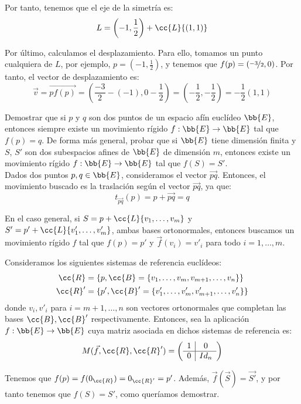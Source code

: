 \begin{ejercicio}
    Por tanto, tenemos que el eje de la simetría es:
    \begin{equation*}
        L = \left(-1, \frac{1}{2}\right) + \cc{L}\{(1,1)\}
    \end{equation*}

    Por último, calculamos el desplazamiento. Para ello, tomamos un punto cualquiera de $L$, por ejemplo, $p=\left(-1, \frac{1}{2}\right)$, y tenemos que $f(p)=(\nicefrac{-3}{2}, 0)$.
    Por tanto, el vector de desplazamiento es:
    \begin{equation*}
        \vec{v} = \vec{p f(p)} = \left(\frac{-3}{2} - (-1), 0 - \frac{1}{2}\right) = \left(-\frac{1}{2}, -\frac{1}{2}\right) = -\frac{1}{2}(1,1)
    \end{equation*}
\end{ejercicio}

\begin{ejercicio}
    Demostrar que si $p$ y $q$ son dos puntos de un espacio afín euclídeo $\bb{E}$, entonces siempre existe un movimiento rígido
    $f : \bb{E} \to \bb{E}$ tal que $f(p) = q$. De forma más general, probar que si $\bb{E}$ tiene dimensión finita y
    $S$, $S'$ son dos subespacios afines de $\bb{E}$ de dimensión $m$, entonces existe un movimiento rígido $f : \bb{E} \to \bb{E}$ tal que $f(S) = S'$.\\

    Dados dos puntos $p,q\in \bb{E}$, consideramos el vector $\vec{pq}$. Entonces, el movimiento buscado es la traslación según el vector $\vec{pq}$, ya que:
    \begin{equation*}
        t_{\vec{pq}}(p) = p + \vec{pq} = q
    \end{equation*}

    En el caso general, si $S=p+\cc{L}\{v_1,\dots,v_m\}$ y $S'=p'+\cc{L}\{v'_1,\dots,v'_m\}$, ambas bases ortonormales, entonces buscamos un movimiento rígido
    $f$ tal que $f(p)=p'$ y $\vec{f}(v_i)=v'_i$ para todo $i=1,\dots,m$.

    Consideramos los siguientes sistemas de referencia euclídeos:
    \begin{align*}
        \cc{R} &= \{p, \cc{B} = \{v_1,\dots,v_m, v_{m+1}, \dots, v_n\}\}\\
        \cc{R}' &= \{p', \cc{B}' = \{v'_1,\dots,v'_m, v'_{m+1}, \dots, v'_n\}\}
    \end{align*}
    donde $v_i, v'_i$ para $i=m+1,\dots,n$ son vectores ortonormales que completan las bases $\cc{B}, \cc{B}'$ respectivamente.
    Entonces, sea la aplicación $f : \bb{E} \to \bb{E}$ cuya matriz asociada en dichos sistemas de referencia es:
    \begin{equation*}
        M(\vec{f},\cc{R},\cc{R}') = \left(
        \begin{array}{c|c}
            1 & 0 \\ \hline
            0 & Id_n
        \end{array}
        \right)
    \end{equation*}
    
    Tenemos que $f(p) = f(0_{\cc{R}}) = 0_{\cc{R}'} = p'$. Además, $\vec{f}\left(\vec{S}\right)=\vec{S'}$, y por tanto tenemos que $f(S)=S'$, como queríamos demostrar.
\end{ejercicio}

